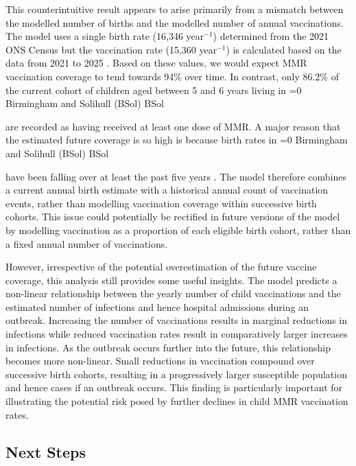 \documentclass[12pt]{article}
\newcounter{bsol}
\newcommand{\bsol}{%
    \ifnum\value{bsol}=0
        \stepcounter{bsol}%
        Birmingham and Solihull (BSol)%
        \else
        BSol%
    \fi%
    \xspace
}
\begin{document}
This counterintuitive result appears to arise primarily from a mismatch between the modelled number of births and the modelled number of annual vaccinations. The model uses a single birth rate (16,346 year$^{-1}$) determined from the 2021 ONS Census but the vaccination rate (15,360 year$^{-1}$) is calculated based on the data from 2021 to 2025 \cite{ONS2021census, NHSEngland2026FDP}. Based on these values, we would expect MMR vaccination coverage to tend towards 94\% over time. In contrast, only 86.2\% of the current cohort of children aged between 5 and 6 years living in \bsol are recorded as having received at least one dose of MMR. A major reason that the estimated future coverage is so high is because birth rates in \bsol have been falling over at least the past five years \cite{ONS2024LiveBirthsICB}. The model therefore combines a current annual birth estimate with a historical annual count of vaccination events, rather than modelling vaccination coverage within successive birth cohorts. This issue could potentially be rectified in future versions of the model by modelling vaccination as a proportion of each eligible birth cohort, rather than a fixed annual number of vaccinations.   

However, irrespective of the potential overestimation of the future vaccine coverage, this analysis still provides some useful insights. The model predicts a non-linear relationship between the yearly number of child vaccinations and the estimated number of infections and hence hospital admissions during an outbreak. Increasing the number of vaccinations results in marginal reductions in infections while reduced vaccination rates result in comparatively larger increases in infections. As the outbreak occurs further into the future, this relationship becomes more non-linear. Small reductions in vaccination compound over successive birth cohorts, resulting in a progressively larger susceptible population and hence cases if an outbreak occurs. This finding is particularly important for illustrating the potential risk posed by further declines in child MMR vaccination rates. 


\subsection{Next Steps}
\end{document}
